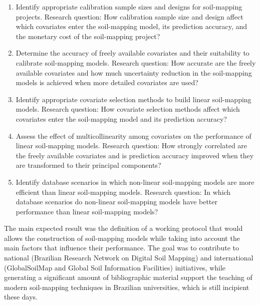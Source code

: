 \begin{enumerate}
\item Identify appropriate calibration sample sizes and designs for soil-mapping projects.\newline
Research question: How calibration sample size and design affect which covariates enter the 
soil-mapping model, its prediction accuracy, and the monetary cost of the soil-mapping project?

\item Determine the accuracy of freely available covariates and their suitability to calibrate 
soil-mapping models.\newline
Research question: How accurate are the freely available covariates and how much uncertainty 
reduction in the soil-mapping models is achieved when more detailed covariates are used?

\item Identify appropriate covariate selection methods to build linear soil-mapping models.\newline
Research question: How covariate selection methods affect which covariates enter the soil-mapping 
model and its prediction accuracy?

\item Assess the effect of multicollinearity among covariates on the performance of linear 
soil-mapping models.\newline
Research question: How strongly correlated are the freely available covariates and is prediction 
accuracy improved when they are transformed to their principal components?

\item Identify database scenarios in which non-linear soil-mapping models are more efficient than 
linear soil-mapping models.\newline
Research question: In which database scenarios do non-linear soil-mapping models have better 
performance than linear soil-mapping models?
\end{enumerate}

The main expected result was the definition of a working protocol that would allows the construction
of soil-mapping models while taking into account the main factors that influence their performance. 
The goal was to contribute to national (Brazilian Research Network on Digital Soil Mapping) and 
international (GlobalSoilMap and Global Soil Information Facilities) initiatives, while generating a
significant amount of bibliographic material support the teaching of modern soil-mapping techniques 
in Brazilian universities, which is still incipient these days.

